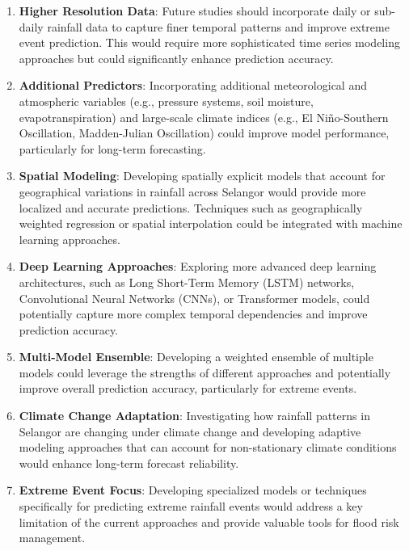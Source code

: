 \documentclass[12pt]{article}
\begin{document}
\begin{enumerate}
    \item \textbf{Higher Resolution Data}: Future studies should incorporate daily or sub-daily rainfall data to capture finer temporal patterns and improve extreme event prediction. This would require more sophisticated time series modeling approaches but could significantly enhance prediction accuracy.
    
    \item \textbf{Additional Predictors}: Incorporating additional meteorological and atmospheric variables (e.g., pressure systems, soil moisture, evapotranspiration) and large-scale climate indices (e.g., El Niño-Southern Oscillation, Madden-Julian Oscillation) could improve model performance, particularly for long-term forecasting.
    
    \item \textbf{Spatial Modeling}: Developing spatially explicit models that account for geographical variations in rainfall across Selangor would provide more localized and accurate predictions. Techniques such as geographically weighted regression or spatial interpolation could be integrated with machine learning approaches.
    
    \item \textbf{Deep Learning Approaches}: Exploring more advanced deep learning architectures, such as Long Short-Term Memory (LSTM) networks, Convolutional Neural Networks (CNNs), or Transformer models, could potentially capture more complex temporal dependencies and improve prediction accuracy.
    
    \item \textbf{Multi-Model Ensemble}: Developing a weighted ensemble of multiple models could leverage the strengths of different approaches and potentially improve overall prediction accuracy, particularly for extreme events.
    
    \item \textbf{Climate Change Adaptation}: Investigating how rainfall patterns in Selangor are changing under climate change and developing adaptive modeling approaches that can account for non-stationary climate conditions would enhance long-term forecast reliability.
    
    \item \textbf{Extreme Event Focus}: Developing specialized models or techniques specifically for predicting extreme rainfall events would address a key limitation of the current approaches and provide valuable tools for flood risk management.
\end{enumerate}
\end{document}
